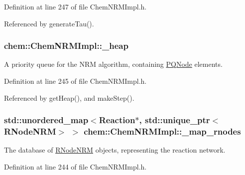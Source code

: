 Definition at line 247 of file Chem\-N\-R\-M\-Impl.\-h.



Referenced by generate\-Tau().

\hypertarget{classchem_1_1ChemNRMImpl_af2063c9b768c13ac541886947c567c1f}{
\subsubsection[{\-\_\-heap}]{ {\bf chem\-::\-Chem\-N\-R\-M\-Impl\-::\-\_\-heap}}}\label{classchem_1_1ChemNRMImpl_af2063c9b768c13ac541886947c567c1f}


A priority queue for the N\-R\-M algorithm, containing \hyperlink{classchem_1_1PQNode}{P\-Q\-Node} elements. 



Definition at line 245 of file Chem\-N\-R\-M\-Impl.\-h.



Referenced by get\-Heap(), and make\-Step().

\hypertarget{classchem_1_1ChemNRMImpl_a6b86101b0c90389e5f027cc4bffccfd3}{
\subsubsection[{\-\_\-map\-\_\-rnodes}]{\setlength{\rightskip}{0pt plus 5cm}std\-::unordered\-\_\-map$<${\bf Reaction}$\ast$, std\-::unique\-\_\-ptr$<${\bf R\-Node\-N\-R\-M}$>$ $>$ {\bf chem\-::\-Chem\-N\-R\-M\-Impl\-::\-\_\-map\-\_\-rnodes}}}\label{classchem_1_1ChemNRMImpl_a6b86101b0c90389e5f027cc4bffccfd3}


The database of \hyperlink{classchem_1_1RNodeNRM}{R\-Node\-N\-R\-M} objects, representing the reaction network. 



Definition at line 244 of file Chem\-N\-R\-M\-Impl.\-h.



